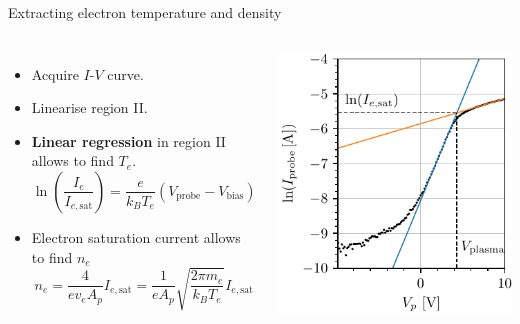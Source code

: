 \documentclass[10pt]{beamer}
\newcommand{\electronsaturationcurrent}[0]{\ensuremath{I_{e,{\mathrm{sat}}}}}
\newcommand{\biasvoltage}{\ensuremath{V_{\mathrm{bias}}}}
\newcommand{\probevoltage}{\ensuremath{V_{\mathrm{probe}}}}
\begin{document}
\begin{frame}{Extracting electron temperature and density}
    \begin{columns}
        \begin{itemize}
            \item Acquire $I$-$V$ curve.
            \item Linearise region II.
            \item \textbf{Linear regression} in region II allows to find $T_e$.
                \begin{equation*}
                    \ln\left(\frac{I_e}{\electronsaturationcurrent} \right) = \frac{e}{k_B T_e}(\probevoltage - \biasvoltage)
                \end{equation*}
            \item Electron saturation current allows to find $n_e$
                \begin{equation*}
                    n_e = \frac{4}{e v_e A_p} \electronsaturationcurrent = \frac{1}{e A_p} \sqrt{\frac{2 \pi m_e}{k_B T_e}} \electronsaturationcurrent
                \end{equation*}
        \end{itemize}

         
        

        \includegraphics[scale=1]{../figures/IV_fit.pdf}
    \end{columns}
\end{frame}
\end{document}
